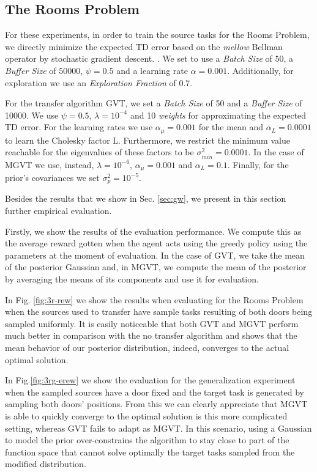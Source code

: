 \documentclass{article}
\begin{document}
\subsection{The Rooms Problem}

For these experiments, in order to train the source tasks for the Rooms Problem, we directly minimize the expected TD error based on the \textit{mellow} Bellman operator by stochastic gradient descent. . We set to use a \textit{Batch Size} of $50$, a \textit{Buffer Size} of $50000$, $\psi=0.5$ and a learning rate $\alpha=0.001$. Additionally, for exploration we use an \textit{Exploration Fraction} of $0.7$.

For the transfer algorithm GVT, we set a \textit{Batch Size} of 50 and a \textit{Buffer Size} of 10000. We use $\psi=0.5$, $\lambda=10^{-4}$ and 10 \textit{weights} for approximating the expected TD error. For the learning rates we use $\alpha_{\mu}=0.001$ for the mean and $\alpha_{L}=0.0001$ to learn the Cholesky factor L. Furthermore, we restrict the minimum value reachable for the eigenvalues of these factors to be $\sigma_{min}^2=0.0001$. In the case of MGVT we use, instead, $\lambda=10^{-6}$, $\alpha_{\mu}=0.001$ and $\alpha_{L}=0.1$. Finally, for the prior's covariances we set $\sigma_p^2=10^{-5}$.

Besides the results that we show in Sec. \ref{sec:gw}, we present in this section further empirical evaluation.

Firstly, we show the results of the evaluation performance. We compute this as the average reward gotten when the agent acts using the greedy policy using the parameters at the moment of evaluation. In the case of GVT, we take the mean of the posterior Gaussian and, in MGVT, we compute the mean of the posterior by averaging the means of its components and use it for evaluation. 

In Fig. \ref{fig:3r-rew} we show the results when evaluating for the Rooms Problem when the sources used to transfer have sample tasks resulting of both doors being sampled uniformly. It is easily noticeable that both GVT and MGVT perform much better in comparison with the no transfer algorithm and shows that the mean behavior of our posterior distribution, indeed, converges to the actual optimal solution. 

In Fig.\ref{fig:3rg-erew} we show the evaluation for the generalization experiment when the sampled sources have a door fixed and the target task is generated by sampling both doors' positions. From this we can clearly appreciate that MGVT is able to quickly converge to the optimal solution is this more complicated setting, whereas GVT fails to adapt as MGVT. In this scenario, using a Gaussian to model the prior over-constrains the algorithm to stay close to part of the function space that cannot solve optimally the target tasks sampled from the modified distribution.
\end{document}
